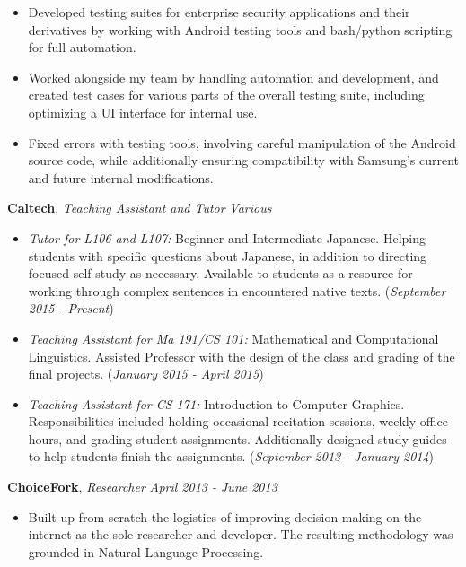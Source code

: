 \documentclass[9pt]{article}
\newenvironment{changemargin}[2]{%
  \begin{list}{}{%
    \setlength{\topsep}{0pt}%
    \setlength{\leftmargin}{#1}%
    \setlength{\rightmargin}{#2}%
    \setlength{\listparindent}{\parindent}%
    \setlength{\itemindent}{\parindent}%
    \setlength{\parsep}{\parskip}%
  }%
  \item[]}{\end{list}
}
\newenvironment{body} {
	\vspace*{-16pt}
	\begin{changemargin}{-0.25in}{-0.5in}
  }	
	{\end{changemargin}
}
\begin{document}
\begin{body}
\begin{itemize}
	\item Developed testing suites for enterprise security applications and their derivatives by working with Android testing tools and bash/python scripting for full automation.
	\item Worked alongside my team by handling automation and development, and created test cases for various parts of the overall testing suite, including optimizing a UI interface for internal use.
	\item Fixed errors with testing tools, involving careful manipulation of the Android source code, while additionally ensuring compatibility with Samsung's current and future internal modifications.
	\end{itemize}
	\newpage
	\vspace*{1pt}
	\textbf{Caltech}, \emph{Teaching Assistant and Tutor} \hfill \emph{Various}\\
	\vspace*{-3pt}
	\begin{itemize} \itemsep -0pt %
	\item \textit{Tutor for L106 and L107:} Beginner and Intermediate Japanese. Helping students with specific questions about Japanese, in addition to directing focused self-study as necessary. Available to students as a resource for working through complex sentences in encountered native texts. (\textit{September 2015 - Present})
	\item \textit{Teaching Assistant for Ma 191/CS 101:} Mathematical and Computational Linguistics. Assisted Professor with the design of the class and grading of the final projects. (\textit{January 2015 - April 2015})
	\item \textit{Teaching Assistant for CS 171:} Introduction to Computer Graphics. Responsibilities included holding occasional recitation sessions, weekly office hours, and grading student assignments. Additionally designed study guides to help students finish the assignments. (\textit{September 2013 - January 2014})	
	\end{itemize}
	\vspace*{5pt}
	\textbf{ChoiceFork}, \emph{Researcher} \hfill \emph{April 2013 - June 2013}\\
	\vspace*{-3pt}
	\begin{itemize} \itemsep -0pt  %
		\item Built up from scratch the logistics of improving decision making on the internet as the sole researcher and developer. The resulting methodology was grounded in Natural Language Processing.

\end{itemize}
\end{body}
\end{document}
